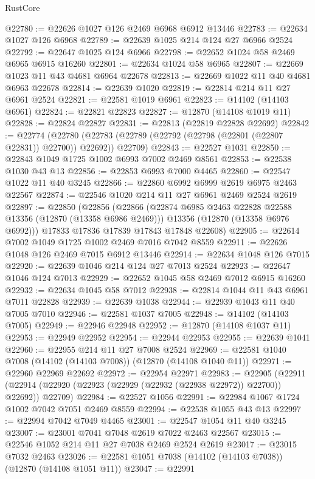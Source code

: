 \begin{lexlean}{RustCore}
\begin{coremodule}
@22780 := @22626 @1027 @126 @2469 @6968 @6912 @13446
@22783 := @22634 @1027 @126 @6968
@22789 := @22639 @1025 @214 @124 @27 @6966 @2524
@22792 := @22647 @1025 @124 @6966
@22798 := @22652 @1024 @58 @2469 @6965 @6915 @16260
@22801 := @22634 @1024 @58 @6965
@22807 := @22669 @1023 @11 @43 @4681 @6964 @22678
@22813 := @22669 @1022 @11 @40 @4681 @6963 @22678
@22814 := @22639 @1020
@22819 := @22814 @214 @11 @27 @6961 @2524
@22821 := @22581 @1019 @6961
@22823 := @14102 (@14103 @6961)
@22824 := @22821 @22823
@22827 := @12870 (@14108 @1019 @11)
@22828 := @22824 @22827
@22831 := @22813 (@22819 @22828 @22692)
@22842 := @22774
    (@22780 (@22783 (@22789 (@22792 (@22798 (@22801 (@22807 @22831)) @22700)) @22692)) @22709)
@22843 := @22527 @1031
@22850 := @22843 @1049 @1725 @1002 @6993 @7002 @2469 @8561
@22853 := @22538 @1030 @43 @13
@22856 := @22853 @6993 @7000 @4465
@22860 := @22547 @1022 @11 @40 @3245
@22866 := @22860 @6992 @6999 @2619 @6975 @2463 @22567
@22874 := @22546 @1020 @214 @11 @27 @6961 @2469 @2524 @2619
@22897 := @22850
    (@22856
      (@22866
        (@22874 @6985 @2463 @22828 @22588 @13356 (@12870 (@13358 @6986 @2469)))
        @13356
        (@12870 (@13358 @6976 @6992)))
      @17833
      @17836
      @17839
      @17843
      @17848
      @22608)
@22905 := @22614 @7002 @1049 @1725 @1002 @2469 @7016 @7042 @8559
@22911 := @22626 @1048 @126 @2469 @7015 @6912 @13446
@22914 := @22634 @1048 @126 @7015
@22920 := @22639 @1046 @214 @124 @27 @7013 @2524
@22923 := @22647 @1046 @124 @7013
@22929 := @22652 @1045 @58 @2469 @7012 @6915 @16260
@22932 := @22634 @1045 @58 @7012
@22938 := @22814 @1044 @11 @43 @6961 @7011 @22828
@22939 := @22639 @1038
@22944 := @22939 @1043 @11 @40 @7005 @7010
@22946 := @22581 @1037 @7005
@22948 := @14102 (@14103 @7005)
@22949 := @22946 @22948
@22952 := @12870 (@14108 @1037 @11)
@22953 := @22949 @22952
@22954 := @22944 @22953
@22955 := @22639 @1041
@22960 := @22955 @214 @11 @27 @7008 @2524
@22969 := @22581 @1040 @7008 (@14102 (@14103 @7008)) (@12870 (@14108 @1040 @11))
@22971 := @22960 @22969 @22692
@22972 := @22954 @22971
@22983 := @22905
    (@22911 (@22914 (@22920 (@22923 (@22929 (@22932 (@22938 @22972)) @22700)) @22692)) @22709)
@22984 := @22527 @1056
@22991 := @22984 @1067 @1724 @1002 @7042 @7051 @2469 @8559
@22994 := @22538 @1055 @43 @13
@22997 := @22994 @7042 @7049 @4465
@23001 := @22547 @1054 @11 @40 @3245
@23007 := @23001 @7041 @7048 @2619 @7022 @2463 @22567
@23015 := @22546 @1052 @214 @11 @27 @7038 @2469 @2524 @2619
@23017 := @23015 @7032 @2463
@23026 := @22581 @1051 @7038 (@14102 (@14103 @7038)) (@12870 (@14108 @1051 @11))
@23047 := @22991

\end{coremodule}
\end{lexlean}
